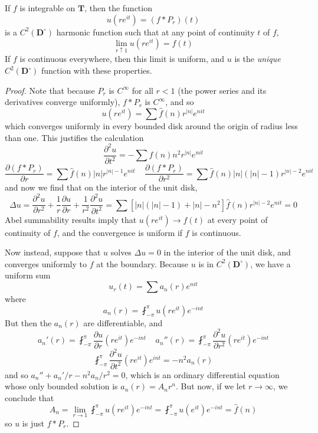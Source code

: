 \begin{theorem}
    If $f$ is integrable on $\mathbf{T}$, then the function
    \[ u(re^{it}) = (f * P_r)(t) \]
    is a $C^2(\mathbf{D}^\circ)$ harmonic function such that at any point of continuity $t$ of $f$,
    \[ \lim_{r \uparrow 1} u(re^{it}) = f(t) \]
    If $f$ is continuous everywhere, then this limit is uniform, and $u$ is the {\it unique} $C^2(\mathbf{D}^\circ)$ function with these properties.
\end{theorem}
\begin{proof}
    Note that because $P_r$ is $C^\infty$ for all $r < 1$ (the power series and its derivatives converge uniformly), $f * P_r$ is $C^\infty$, and so
    \[ u(re^{it}) = \sum \widehat{f}(n) r^{|n|} e^{nit} \]
    which converges uniformly in every bounded disk around the origin of radius less than one. This justifies the calculation
    \[ \frac{\partial^2 u}{\partial t^2} = - \sum \widehat{f}(n) n^2 r^{|n|} e^{nit} \]
    \[ \frac{\partial (f * P_r)}{\partial r} = \sum \widehat{f}(n) |n| r^{|n|-1} e^{nit}\ \ \ \ \ \frac{\partial (f * P_r)}{\partial r^2} = \sum \widehat{f}(n) |n| (|n| - 1) r^{|n|-2} e^{nit} \]
    and now we find that on the interior of the unit disk,
    \[ \Delta u = \frac{\partial^2 u}{\partial r^2} + \frac{1}{r} \frac{\partial u}{\partial r} + \frac{1}{r^2} \frac{\partial^2 u}{\partial t^2} = \sum [|n|(|n|-1) + |n| - n^2] \widehat{f}(n) r^{|n|-2} e^{nit} = 0 \]
    Abel summability results imply that $u(re^{it}) \to f(t)$ at every point of continuity of $f$, and the convergence is uniform if $f$ is continuous.

    Now instead, suppose that $u$ solves $\Delta u = 0$ in the interior of the unit disk, and converges uniformly to $f$ at the boundary. Because $u$ is in $C^2(\mathbf{D}^\circ)$, we have a uniform sum
    \[ u_r(t) = \sum a_n(r) e^{nit} \]
    where
    \[ a_n(r) = \fint_{-\pi}^\pi u(re^{it}) e^{-int} \]
    But then the $a_n(r)$ are differentiable, and
    \[ a_n'(r) = \fint_{-\pi}^\pi \frac{\partial u}{\partial r}(re^{it}) e^{-int}\ \ \ \ \ a_n''(r) = \fint_{-\pi}^\pi \frac{\partial^2 u}{\partial r^2}(re^{it}) e^{-int} \]
    \[ \fint_{-\pi}^\pi \frac{\partial^2 u}{\partial t^2}(re^{it}) e^{int} = - n^2 a_n(r) \]
    and so $a_n'' + a_n'/r - n^2 a_n/r^2 = 0$, which is an ordinary differential equation whose only bounded solution is $a_n(r) = A_nr^n$. But now, if we let $r \to \infty$, we conclude that
    \[ A_n = \lim_{r \to 1} \fint_{-\pi}^\pi u(re^{it}) e^{-int} = \fint_{-\pi}^\pi u(e^{it}) e^{-int} = \widehat{f}(n) \]
    so $u$ is just $f * P_r$.
\end{proof}

